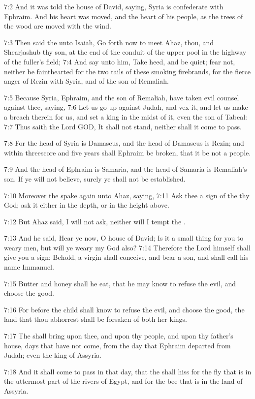 7:2 And it was told the house of David, saying, Syria is confederate with Ephraim. And his heart was moved, and the heart of his people, as the trees of the wood are moved with the wind.

7:3 Then said the \LORD unto Isaiah, Go forth now to meet Ahaz, thou, and Shearjashub thy son, at the end of the conduit of the upper pool in the highway of the fuller's field; 7:4 And say unto him, Take heed, and be quiet; fear not, neither be fainthearted for the two tails of these smoking firebrands, for the fierce anger of Rezin with Syria, and of the son of Remaliah.

7:5 Because Syria, Ephraim, and the son of Remaliah, have taken evil counsel against thee, saying, 7:6 Let us go up against Judah, and vex it, and let us make a breach therein for us, and set a king in the midst of it, even the son of Tabeal: 7:7 Thus saith the Lord GOD, It shall not stand, neither shall it come to pass.

7:8 For the head of Syria is Damascus, and the head of Damascus is Rezin; and within threescore and five years shall Ephraim be broken, that it be not a people.

7:9 And the head of Ephraim is Samaria, and the head of Samaria is Remaliah's son. If ye will not believe, surely ye shall not be established.

7:10 Moreover the \LORD spake again unto Ahaz, saying, 7:11 Ask thee a sign of the \LORD thy God; ask it either in the depth, or in the height above.

7:12 But Ahaz said, I will not ask, neither will I tempt the \LORD.

7:13 And he said, Hear ye now, O house of David; Is it a small thing for you to weary men, but will ye weary my God also?  7:14 Therefore the Lord himself shall give you a sign; Behold, a virgin shall conceive, and bear a son, and shall call his name Immanuel.

7:15 Butter and honey shall he eat, that he may know to refuse the evil, and choose the good.

7:16 For before the child shall know to refuse the evil, and choose the good, the land that thou abhorrest shall be forsaken of both her kings.

7:17 The \LORD shall bring upon thee, and upon thy people, and upon thy father's house, days that have not come, from the day that Ephraim departed from Judah; even the king of Assyria.

7:18 And it shall come to pass in that day, that the \LORD shall hiss for the fly that is in the uttermost part of the rivers of Egypt, and for the bee that is in the land of Assyria.

